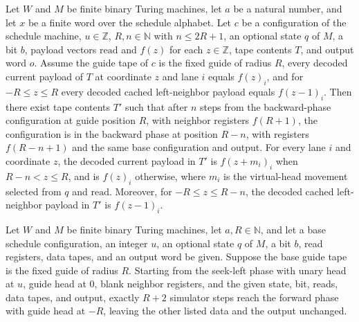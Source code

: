 \begin{lemma}
\label{Complexity.dataCfg_backward_prefix}
\leanok
{}
Let $W$ and $M$ be finite binary Turing machines, let $a$ be a natural number, and let
$x$ be a finite word over the schedule alphabet. Let $c$ be a configuration of the
schedule machine, $u\in\mathbb{Z}$, $R,n\in\mathbb{N}$ with $n\le 2R+1$, an optional
state $q$ of $M$, a bit $b$, payload vectors $\mathrm{read}$ and $f(z)$ for each
$z\in\mathbb{Z}$, tape contents $T$, and output word $o$. Assume the guide tape of $c$
is the fixed guide of radius $R$, every decoded current payload of $T$ at coordinate $z$
and lane $i$ equals $f(z)_i$, and for $-R\le z\le R$ every decoded cached left-neighbor
payload equals $f(z-1)_i$. Then there exist tape contents $T'$ such that after $n$ steps
from the backward-phase configuration at guide position $R$, with neighbor registers
$f(R+1)$, the configuration is in the backward phase at position $R-n$, with registers
$f(R-n+1)$ and the same base configuration and output. For every lane $i$ and coordinate
$z$, the decoded current payload in $T'$ is $f(z+m_i)_i$ when $R-n<z\le R$, and is
$f(z)_i$ otherwise, where $m_i$ is the virtual-head movement selected from $q$ and
$\mathrm{read}$. Moreover, for $-R\le z\le R-n$, the decoded cached left-neighbor
payload in $T'$ is $f(z-1)_i$.
\end{lemma}

\begin{lemma}
\label{Complexity.dataCfg_seek_run}
\leanok
{}
Let $W$ and $M$ be finite binary Turing machines, let $a,R\in\mathbb{N}$, and let a base
schedule configuration, an integer $u$, an optional state $q$ of $M$, a bit $b$, read
registers, data tapes, and an output word be given. Suppose the base guide tape is the
fixed guide of radius $R$. Starting from the seek-left phase with unary head at $u$,
guide head at $0$, blank neighbor registers, and the given state, bit, reads, data
tapes, and output, exactly $R+2$ simulator steps reach the forward phase with guide head
at $-R$, leaving the other listed data and the output unchanged.
\end{lemma}

